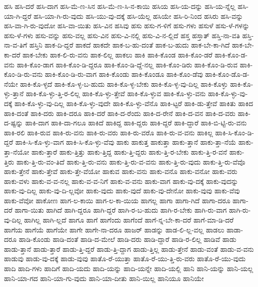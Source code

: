 {ಹಸಿ
ಹಸಿ-ದರೆ
ಹಸಿ-ದಾಗ
ಹಸಿ-ಮೆ-ಣ-ಸಿನ
ಹಸಿ-ಮೆ-ಣ-ಸಿ-ನ-ಕಾಯಿ
ಹಸಿಯ
ಹಸಿ-ಯ-ದನ್ನು
ಹಸಿ-ಯ-ನ್ನೆಲ್ಲ
ಹಸಿ-ಯಾ-ಗಿ-ದ್ದರೆ
ಹಸಿ-ಯಾ-ಗಿ-ರು-ವುದು
ಹಸಿ-ಯು-ವು-ದಕ್ಕೆ
ಹಸಿ-ಯೆಲ್ಲ
ಹಸಿಯೇ
ಹಸಿ-ರಿ-ನಿಂದ
ಹಸಿರು
ಹಸಿ-ವನ್ನು
ಹಸಿ-ವಾ-ಗಿ-ರು-ವುದೋ
ಹಸಿ-ವಾ-ಯಿತು
ಹಸಿ-ವಿನ
ಹಸಿವು
ಹಸು
ಹಸು-ಗ-ಳಿಗೆ
ಹಸು-ಗಳು
ಹಸುಳೆ
ಹಸು-ಳೆ-ಗಳನ್ನು
ಹಸು-ಳೆ-ಗಳು
ಹಸು-ವನ್ನು
ಹಸು-ವಲ್ಲ
ಹಸು-ವಿನ
ಹಸು-ವಿ-ನಲ್ಲಿ
ಹಸು-ವಿ-ನ-ಲ್ಲಿದೆ
ಹಸ್ತ
ಹಸ್ತಾತ್
ಹಸ್ತಿ-ನಾ-ವತಿ
ಹಸ್ತಿ-ನಾ-ವ-ತಿಗೆ
ಹಸ್ತಿನಿ
ಹಾಕ-ದಿ-ದ್ದರೆ
ಹಾಕದೆ
ಹಾಕದೇ
ಹಾಕ-ಬ-ಹು-ದಂತೆ
ಹಾಕ-ಬ-ಹುದು
ಹಾಕ-ಬೇ-ಕಾ-ಗಿದೆ
ಹಾಕ-ಬೇ-ಕಾ-ದರೆ
ಹಾಕ-ಬೇಕು
ಹಾಕ-ಲಿ-ರು-ವನು
ಹಾಕ-ಲಿಲ್ಲ
ಹಾಕಲು
ಹಾಕಿ
ಹಾಕಿ-ಕೊಂಡ
ಹಾಕಿ-ಕೊಂ-ಡರೆ
ಹಾಕಿ-ಕೊಂ-ಡ-ವನು
ಹಾಕಿ-ಕೊಂ-ಡಾಗ
ಹಾಕಿ-ಕೊಂ-ಡಿ-ದ್ದರೂ
ಹಾಕಿ-ಕೊಂ-ಡಿ-ದ್ದೆ-ನಲ್ಲ
ಹಾಕಿ-ಕೊಂ-ಡಿರು
ಹಾಕಿ-ಕೊಂ-ಡಿ-ರುವ
ಹಾಕಿ-ಕೊಂ-ಡಿ-ರು-ವನು
ಹಾಕಿ-ಕೊಂ-ಡಿ-ರು-ವಾಗ
ಹಾಕಿ-ಕೊಂಡು
ಹಾಕಿ-ಕೊಂಡೂ
ಹಾಕಿ-ಕೊಂ-ಡೆವು
ಹಾಕಿ-ಕೊಂ-ಡೊ-ಡ-ನೆಯೇ
ಹಾಕಿ-ಕೊ-ಳ್ಳದೆ
ಹಾಕಿ-ಕೊ-ಳ್ಳ-ಬ-ಹುದು
ಹಾಕಿ-ಕೊ-ಳ್ಳ-ಬೇಕು
ಹಾಕಿ-ಕೊ-ಳ್ಳ-ವು-ದಿಲ್ಲ
ಹಾಕಿ-ಕೊಳ್ಳು
ಹಾಕಿ-ಕೊ-ಳ್ಳು-ತ್ತಾನೆ
ಹಾಕಿ-ಕೊ-ಳ್ಳು-ತ್ತಿ-ರ-ಲಿಲ್ಲ
ಹಾಕಿ-ಕೊ-ಳ್ಳು-ತ್ತೇವೆ
ಹಾಕಿ-ಕೊ-ಳ್ಳುವ
ಹಾಕಿ-ಕೊ-ಳ್ಳು-ವನು
ಹಾಕಿ-ಕೊ-ಳ್ಳು-ವು-ದಕ್ಕೆ
ಹಾಕಿ-ಕೊ-ಳ್ಳು-ವು-ದಿಲ್ಲ
ಹಾಕಿ-ಕೊ-ಳ್ಳು-ವುದೇ
ಹಾಕಿ-ಕೊ-ಳ್ಳು-ವೆನೊ
ಹಾಕಿ-ಟ್ಟರೆ
ಹಾಕಿ-ಡು-ತ್ತೇವೆ
ಹಾಕಿತು
ಹಾಕಿದ
ಹಾಕಿ-ದಂತೆ
ಹಾಕಿ-ದರು
ಹಾಕಿ-ದರೂ
ಹಾಕಿ-ದರೆ
ಹಾಕಿ-ದ-ರೆಂದು
ಹಾಕಿ-ದ-ರೇನೆ
ಹಾಕಿ-ದ-ವನ
ಹಾಕಿ-ದ-ವರು
ಹಾಕಿ-ದ-ಷ್ಟನ್ನು
ಹಾಕಿ-ದಾಗ
ಹಾಕಿ-ದಾ-ಗಲೂ
ಹಾಕಿದೆ
ಹಾಕಿದ್ದ
ಹಾಕಿ-ದ್ದರು
ಹಾಕಿ-ದ್ದರೆ
ಹಾಕಿ-ದ್ದಾರೆ
ಹಾಕಿ-ಬಿ-ಟ್ಟಿ-ರು-ವನು
ಹಾಕಿ-ರಲಿ
ಹಾಕಿ-ರುವ
ಹಾಕಿ-ರು-ವನು
ಹಾಕಿ-ರು-ವರು
ಹಾಕಿ-ರು-ವರೊ
ಹಾಕಿ-ರು-ವ-ವನು
ಹಾಕಿಲ್ಲ
ಹಾಕಿ-ಸಿ-ಕೊಂ-ಡಿ-ದ್ದರೆ
ಹಾಕಿ-ಸಿ-ಕೊ-ಳ್ಳು-ವಾಗ
ಹಾಕಿ-ಸಿ-ಕೊ-ಳ್ಳು-ವೆವು
ಹಾಕು
ಹಾಕುತ್ತ
ಹಾಕುತ್ತಾ
ಹಾಕು-ತ್ತಾನೆ
ಹಾಕು-ತ್ತಾ-ನೆಯೆ
ಹಾಕು-ತ್ತಾ-ನೆಯೋ
ಹಾಕು-ತ್ತಾರೆ
ಹಾಕು-ತ್ತಿತ್ತು
ಹಾಕು-ತ್ತಿದ್ದ
ಹಾಕು-ತ್ತಿ-ದ್ದರು
ಹಾಕು-ತ್ತಿ-ರ-ಬೇಕು
ಹಾಕು-ತ್ತಿ-ರ-ವನೆ
ಹಾಕು-ತ್ತಿರು
ಹಾಕು-ತ್ತಿ-ರು-ವಂ-ತಿದೆ
ಹಾಕು-ತ್ತಿ-ರು-ವನು
ಹಾಕು-ತ್ತಿ-ರು-ವ-ವನು
ಹಾಕು-ತ್ತಿ-ರು-ವುದು
ಹಾಕು-ತ್ತಿ-ರು-ವೆವೊ
ಹಾಕು-ತ್ತೇನೆ
ಹಾಕು-ತ್ತೇವೆ
ಹಾಕು-ತ್ತೇ-ವೆಯೋ
ಹಾಕುವ
ಹಾಕು-ವನು
ಹಾಕು-ವನೊ
ಹಾಕು-ವನೋ
ಹಾಕು-ವರು
ಹಾಕು-ವಳು
ಹಾಕು-ವ-ವ-ನಲ್ಲ
ಹಾಕು-ವ-ವ-ನಿಗೆ
ಹಾಕು-ವ-ವನು
ಹಾಕು-ವಾಗ
ಹಾಕು-ವು-ದಕ್ಕೆ
ಹಾಕು-ವುದನ್ನು
ಹಾಕು-ವು-ದಿಲ್ಲ
ಹಾಕು-ವು-ದಿ-ಲ್ಲವೋ
ಹಾಕು-ವುದು
ಹಾಕು-ವುದೆ
ಹಾಕು-ವು-ದೇನೋ
ಹಾಕು-ವುವು
ಹಾಕು-ವೆವು
ಹಾಕು-ವೆವೋ
ಹಾಕೋಣ
ಹಾಗ-ಲ-ಕಾಯಿ
ಹಾಗ-ಲ-ಕಾ-ಯಿಯ
ಹಾಗಲ್ಲ
ಹಾಗಾ
ಹಾಗಾ-ಗಿದೆ
ಹಾಗಾ-ದರೂ
ಹಾಗಾ-ದರೆ
ಹಾಗಾ-ಯಿತು
ಹಾಗಿದೆ
ಹಾಗಿ-ದ್ದರೂ
ಹಾಗಿ-ದ್ದರೆ
ಹಾಗಿ-ರ-ಬ-ಹುದು
ಹಾಗಿ-ರ-ಬೇಕು
ಹಾಗಿ-ರು-ವಾಗ
ಹಾಗಿ-ರು-ವು-ದಿಲ್ಲ
ಹಾಗಿಲ್ಲ
ಹಾಗಿ-ಲ್ಲದೆ
ಹಾಗೂ
ಹಾಗೆ
ಹಾಗೆಂದು
ಹಾಗೆಂದೆ
ಹಾಗೆ-ನ್ನ-ಬೇ-ಕಾ-ದರೆ
ಹಾಗೆ-ಮಾ-ಡಿ-ದರೆ
ಹಾಗೆಯ
ಹಾಗೆಯೆ
ಹಾಗೆಯೇ
ಹಾಗೇ
ಹಾಗೇ-ನಾ-ದರೂ
ಹಾಜರ್
ಹಾಡನ್ನು
ಹಾಡ-ಲಿ-ಲ್ಲ-ವಲ್ಲ
ಹಾಡಲು
ಹಾಡಾ-ದರೂ
ಹಾಡಿ-ಕೊಂಡು
ಹಾಡಿ-ದಂತೆ
ಹಾಡಿ-ದ-ಮೇಲೆ
ಹಾಡಿ-ದರು
ಹಾಡಿ-ದ್ದಾರೆ
ಹಾಡಿ-ರ-ಲಿಲ್ಲ
ಹಾಡಿವೆ
ಹಾಡು
ಹಾಡು-ತ್ತಾನೆ
ಹಾಡು-ತ್ತಾರೆ
ಹಾಡು-ತ್ತಿ-ದ್ದರೆ
ಹಾಡು-ತ್ತಿ-ದ್ದಾಗ
ಹಾಡು-ತ್ತಿಲ್ಲ
ಹಾಡು-ತ್ತೇನೆ
ಹಾಡು-ವಂತೆ
ಹಾಡು-ವ-ವನು
ಹಾಡುವು
ಹಾಡು-ವು-ದಕ್ಕೆ
ಹಾಡು-ವುವು
ಹಾತೊ-ರೆ-ಯುತ್ತಾ
ಹಾತೊ-ರೆ-ಯು-ತ್ತಿ-ರು-ವರು
ಹಾತೊ-ರೆ-ಯು-ವುದು
ಹಾದಿ
ಹಾದಿ-ಗಳು
ಹಾದಿಗೆ
ಹಾದಿ-ಯದು
ಹಾದಿ-ಯನ್ನು
ಹಾದಿ-ಯನ್ನೇ
ಹಾದಿ-ಯಲ್ಲಿ
ಹಾನಿ
ಹಾನಿ-ಯನ್ನು
ಹಾನಿ-ಯಲ್ಲ
ಹಾನಿ-ಯಾ-ಗದ
ಹಾನಿ-ಯಾ-ಗು-ವುದು
ಹಾನಿ-ಯಾ-ದೀತು
ಹಾನಿ-ಯಿಲ್ಲ
ಹಾನಿಯೂ
ಹಾನಿಯೇ
}
